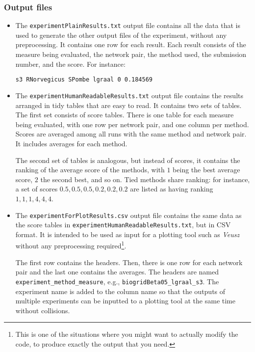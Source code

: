 \documentclass[]{article}
\begin{document}
\subsubsection*{Output files}
\begin{itemize}
\item The \verb|experimentPlainResults.txt| output file contains all the data that is used to generate the other output files of the experiment, without any preprocessing. It contains one row for each result. Each result consists of the measure being evaluated, the network pair, the method used, the submission number, and the score. For instance:
\begin{verbatim}
s3 RNorvegicus SPombe lgraal 0 0.184569
\end{verbatim}
\item The \verb|experimentHumanReadableResults.txt| output file contains the results arranged in tidy tables that are easy to read. It contains two sets of tables. The first set consists of score tables. There is one table for each measure being evaluated, with one row per network pair, and one column per method. Scores are averaged among all runs with the same method and network pair. It includes averages for each method.

The second set of tables is analogous, but instead of scores, it contains the ranking of the average score of the methods, with $1$ being the best average score, $2$ the second best, and so on. Tied methods share ranking: for instance, a set of scores $0.5, 0.5, 0.5, 0.2, 0.2, 0.2$ are listed as having ranking $1, 1, 1, 4, 4, 4$.

\item The \verb|experimentForPlotResults.csv| output file contains the same data as the score tables in \verb|experimentHumanReadableResults.txt|, but in CSV format. It is intended to be used as input for a plotting tool such as \textit{Veusz} without any preprocessing required\footnote{This is one of the situations where you might want to actually modify the code, to produce exactly the output that you need.}.

The first row contains the headers. Then, there is one row for each network pair and the last one contains the averages. The headers are named \verb|experiment_method_measure|, e.g., \verb|biogridBeta05_lgraal_s3|. The experiment name is added to the column name so that the outputs of multiple experiments can be inputted to a plotting tool at the same time without collisions.
\end{itemize}
\end{document}
